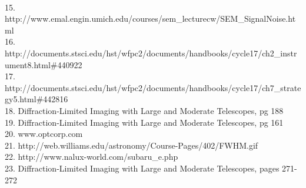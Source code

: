 \documentclass[pdf,color]{UoBnote}
\begin{document}
\\
15. http://www.emal.engin.umich.edu/courses/sem\_lecturecw/SEM\_SignalNoise.html
\\
16.	http://documents.stsci.edu/hst/wfpc2/documents/handbooks/cycle17/ch2\_instrument8.html\#440922
\\
17.	http://documents.stsci.edu/hst/wfpc2/documents/handbooks/cycle17/ch7\_strategy5.html\#442816
\\
18. Diffraction-Limited Imaging with Large and Moderate Telescopes, pg 188
\\
19. Diffraction-Limited Imaging with Large and Moderate Telescopes, pg 161
\\
20. www.optcorp.com
\\
21. http://web.williams.edu/astronomy/Course-Pages/402/FWHM.gif
\\
22. http://www.nalux-world.com/subaru\_e.php
\\
23. Diffraction-Limited Imaging with Large and Moderate Telescopes, pages 271-272
\end{document}

